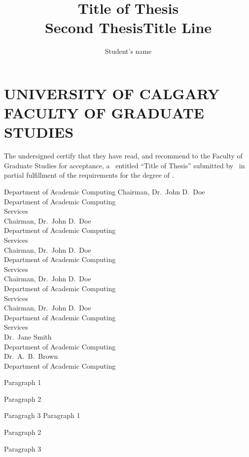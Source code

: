 \documentclass{ucalgthes1}
\title{Title of Thesis \\ \bigskip Second ThesisTitle Line }
\author{Student's name}
\newcommand{\thesistitle}{Title of Thesis}
\begin{document}
\makethesistitle
{}     %
\setcounter{page}{1}
\chapter*{UNIVERSITY OF CALGARY \\ FACULTY OF GRADUATE STUDIES}
\thispagestyle{empty}
The undersigned certify that they have read, and recommend
to the Faculty of Graduate Studies for acceptance, a \Thesis\ entitled
``\thesistitle'' submitted by \Author\
in partial fulfillment of the requirements for the degree of
\Degree.\\

%
%
\begin{signing}{Department of Academic Computing}
\signline
Chairman, Dr.~John D.~Doe \\
Department of Academic Computing \\
Services  \\
\signline
Chairman, Dr.~John D.~Doe \\
Department of Academic Computing \\
Services  \\
\signline
Chairman, Dr.~John D.~Doe \\
Department of Academic Computing \\
Services  \\
\signline
Chairman, Dr.~John D.~Doe \\
Department of Academic Computing \\
Services  \\
\newsigncolumn
\signline
Chairman, Dr.~John D.~Doe \\
Department of Academic Computing \\
Services  \\
\signline
Dr.~Jane Smith \\
Department of Academic Computing  \\

\signline
Dr.~A.~B.~Brown \\
Department of Academic Computing  \\
\end{signing}
%
\newpage
{}
{} 
Paragraph 1

Paragraph 2

Paragragh 3
\newpage
{}
{}
Paragraph 1

Paragraph 2

Paragraph 3

\begin{singlespace}
\newpage
{}
\tableofcontents
\pagestyle{plain}
\newpage
{}
\listoftables
\pagestyle{plain}
\newpage
{}
\listoffigures
\pagestyle{plain}
\clearpage
\end{singlespace}
\clearpage          %


%
%
%
%
\appendix

\end{document}
